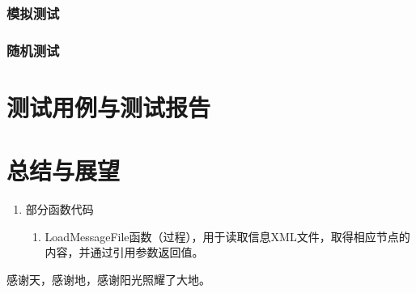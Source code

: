 \documentclass[printMode]{ecnuthesis}
\begin{document}
\subsection{模拟测试}
\subsection{随机测试}


\chapter{测试用例与测试报告}

\chapter{总结与展望}


\backmatter
\PrintReference

\begin{appendix}
  \begin{enumerate}
    \item 部分函数代码
    \begin{enumerate}[label=（\arabic*）]
      \item LoadMessageFile函数（过程），用于读取信息XML文件，取得相应节点的内容，并通过引用参数返回值。
    \end{enumerate}
  \end{enumerate}
\end{appendix}

\begin{acknowledgement}
  感谢天，感谢地，感谢阳光照耀了大地。
\end{acknowledgement}
\end{document}
